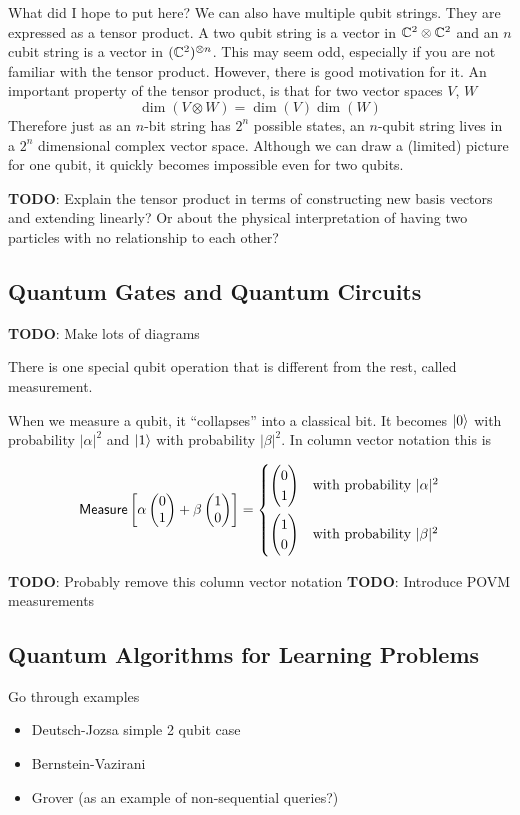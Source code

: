 \documentclass[12pt,twoside]{reedthesis}
\theoremstyle{definition}\newtheorem{definition}{Definition}
\theoremstyle{definition}\newtheorem{example}{Example}
\newcommand{\TODO}[1]{{ \color{red} \textbf{TODO}: {#1}}}
\begin{document}
        What did I hope to put here?
        We can also have multiple qubit strings. They are expressed as a tensor product. A two qubit string is a vector in $\mathbb{C}^2 \otimes \mathbb{C}^2$ and an $n$ cubit string is a vector in $(\mathbb{C}^2)^{\otimes n}$. This may seem odd, especially if you are not familiar with the tensor product. However, there is good motivation for it. An important property of the tensor product, is that for two vector spaces $V$, $W$
        \[
            \dim (V \otimes W ) = \dim(V)\dim(W)
        \]
        Therefore just as an $n$-bit string has $2^n$ possible states, an $n$-qubit string lives in a $2^n$ dimensional complex vector space. Although we can draw a (limited) picture for one qubit, it quickly becomes impossible even for two qubits.

        \TODO{Explain the tensor product in terms of constructing new basis vectors and extending linearly? Or about the physical interpretation of having two particles with no relationship to each other?}


        \subsection{Quantum Gates and Quantum Circuits}

        \TODO{Make lots of diagrams}

        There is one special qubit operation that is different from the rest, called measurement.

        When we measure a qubit, it ``collapses'' into a classical bit. It becomes $\ket{0}$ with probability $|\alpha|^2$ and $\ket{1}$ with probability $|\beta|^2$. In column vector notation this is

        \[
            \textsf{Measure}\left[\alpha\cvec{0}{1} + \beta\cvec{1}{0}\right] = 
            \begin{cases}
                \cvec{0}{1} &\text{with probability } |\alpha|^2 \vspace{5px}\\
                \cvec{1}{0} &\text{with probability } |\beta|^2
            \end{cases}
        \]

        \TODO{Probably remove this column vector notation}
        \TODO{Introduce POVM measurements}

        \subsection{Quantum Algorithms for Learning Problems}
        Go through examples
        \begin{itemize}
            \item Deutsch-Jozsa simple 2 qubit case 
            \item Bernstein-Vazirani
            \item Grover (as an example of non-sequential queries?)
        \end{itemize}
\end{document}
